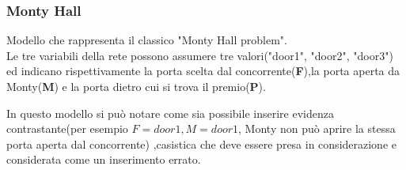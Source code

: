 \documentclass[a4paper]{article}
\begin{document}
\subsubsection{Monty Hall}
Modello che rappresenta il classico "Monty Hall problem".\\
Le tre variabili della rete possono assumere tre valori("door1", "door2", "door3") ed indicano rispettivamente la porta scelta dal concorrente(\textbf{F}),la porta aperta da Monty(\textbf{M}) e la porta dietro cui si trova il premio(\textbf{P}).

\begin{table}[H]
\end{table}
In questo modello si può notare come sia possibile inserire evidenza contrastante(per esempio $F=door1,M=door1$, Monty non può aprire la stessa porta aperta dal concorrente) ,casistica che deve essere presa in considerazione e considerata come un inserimento errato.
\end{document}
